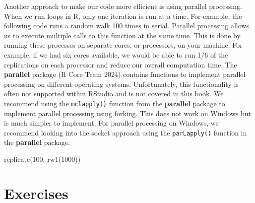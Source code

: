 \documentclass[
  letterpaper,
]{latex/krantz}
\makeatletter
\newenvironment{Shaded}{\begin{snugshade}}{\end{snugshade}}
\newcommand{\DecValTok}[1]{\textcolor[rgb]{0.68,0.00,0.00}{#1}}
\newcommand{\FunctionTok}[1]{\textcolor[rgb]{0.28,0.35,0.67}{#1}}
\newcommand{\NormalTok}[1]{\textcolor[rgb]{0.00,0.23,0.31}{#1}}
\newenvironment{kframe}{%
\medskip{}
\setlength{\fboxsep}{.8em}
 \def\at@end@of@kframe{}%
 \ifinner\ifhmode%
  \def\at@end@of@kframe{\end{minipage}}%
  \begin{minipage}{\columnwidth}%
 \fi\fi%
 \def\FrameCommand##1{\hskip\@totalleftmargin \hskip-\fboxsep
 \colorbox{shadecolor}{##1}\hskip-\fboxsep
     \hskip-\linewidth \hskip-\@totalleftmargin \hskip\columnwidth}%
 \MakeFramed {\advance\hsize-\width
   \@totalleftmargin\z@ \linewidth\hsize
   \@setminipage}}%
 {\par\unskip\endMakeFramed%
 \at@end@of@kframe}
\renewenvironment{Shaded}{\begin{kframe}}{\end{kframe}}
\makeatother
\begin{document}
Another approach to make our code more efficient is using parallel
processing. When we run loops in R, only one iteration is run at a time.
For example, the following code runs a random walk 100 times in serial.
Parallel processing allows us to execute multiple calls to this function
at the same time. This is done by running these processes on separate
cores, or processors, on your machine. For example, if we had six cores
available, we would be able to run 1/6 of the replications on each
processor and reduce our overall computation time. The \textbf{parallel}
package (R Core Team 2024)  contains
functions to implement parallel processing on different operating
systems. Unfortunately, this functionality is often not supported within
RStudio and is not covered in this book. We recommend using the
\texttt{mclapply()} function from the \textbf{parallel} package to
implement parallel processing using forking. This does not work on
Windows but is much simpler to implement. For parallel processing on
Windows, we recommend looking into the socket approach using the
\texttt{parLapply()} function in the \textbf{parallel} package.

\begin{Shaded}
\begin{Highlighting}[]
\FunctionTok{replicate}\NormalTok{(}\DecValTok{100}\NormalTok{, }\FunctionTok{rw1}\NormalTok{(}\DecValTok{1000}\NormalTok{))}
\end{Highlighting}
\end{Shaded}

\section{Exercises}\label{exercises-13}
\end{document}
